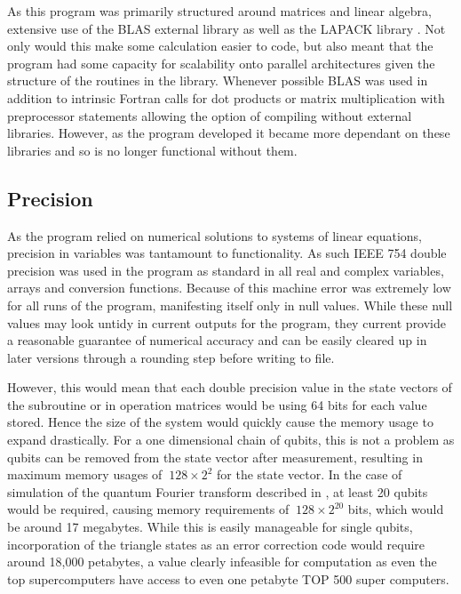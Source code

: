 As this program was primarily structured around matrices and linear algebra, extensive use of the BLAS external library as well as the LAPACK library \citep{lapack}. Not only would this make some calculation easier to code, but also meant that the program had some capacity for scalability onto parallel architectures given the structure of the routines in the library. Whenever possible BLAS was used in addition to intrinsic Fortran calls for dot products or matrix multiplication with preprocessor statements allowing the option of compiling without external libraries. However, as the program developed it became more dependant on these libraries and so is no longer functional without them.


\subsection{Precision}

As the program relied on numerical solutions to systems of linear equations, precision in variables was tantamount to functionality. As such IEEE 754 double precision \cite{_ieee_2008} was used in the program as standard in all real and complex variables, arrays and conversion functions. Because of this machine error was extremely low for all runs of the program, manifesting itself only in null values. While these null values may look untidy in current outputs for the program, they current provide a reasonable guarantee of numerical accuracy and can be easily cleared up in later versions through a rounding step before writing to file. 

However, this would mean that each double precision value in the state vectors of the subroutine or in operation matrices would be using 64 bits for each value stored. Hence the size of the system would quickly cause the memory usage to expand drastically. For a one dimensional chain of qubits, this is not a problem as qubits can be removed from the state vector after measurement, resulting in maximum memory usages of $~128 \times 2^{2}$ for the state vector. In the case of simulation of the quantum Fourier transform described in \citep{raussendorf_measurement-based_2003}, at least 20 qubits would be required, causing memory requirements of $~128 \times 2^{20}$ bits, which would be around 17 megabytes. While this is easily manageable for single qubits, incorporation of the triangle states as an error correction code would require around 18,000 petabytes, a value clearly infeasible for computation as even the top supercomputers have access to even one petabyte \citep{_top500_????} TOP 500 super computers. 

